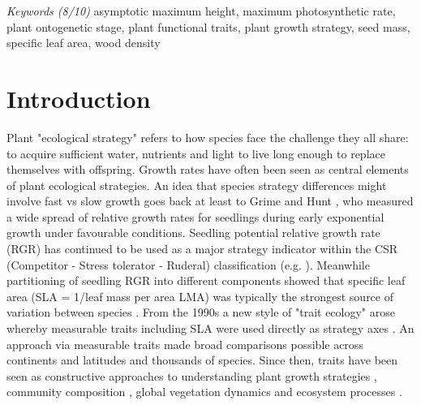\documentclass[a4paper]{article}\usepackage[]{graphicx}\usepackage[]{color}
\begin{document}
\textit{Keywords (8/10)} asymptotic maximum height, maximum photosynthetic rate, plant ontogenetic stage, plant functional traits, plant growth strategy, seed mass, specific leaf area, wood density 


\clearpage

\section*{Introduction}\label{introduction}
Plant "ecological strategy" refers to how species face the challenge they all share: to acquire sufficient water, nutrients and light to live long enough to replace themselves with offspring. Growth rates have often been seen as central elements of plant ecological strategies. An idea that species strategy differences might involve fast vs slow growth goes back at least to Grime and Hunt \citeyearpar{Grime:1975gr}, who measured a wide spread of relative growth rates for seedlings during early exponential growth under favourable conditions. Seedling potential relative growth rate (RGR) has continued to be used as a major strategy indicator within the CSR (Competitor - Stress tolerator - Ruderal) classification (e.g. \citealt{grime1979plant, Grime:1997wm}). Meanwhile partitioning of seedling RGR into different components showed that specific leaf area (SLA = 1/leaf mass per area LMA) was typically the strongest source of variation between species \citep{Poorter:1989tx}. From the 1990s a new style of "trait ecology" arose whereby measurable traits including SLA were used directly as strategy axes \citep{Westoby:2002ft}. An approach via measurable traits made broad comparisons possible across continents and latitudes and thousands of species. Since then, traits have been seen as constructive approaches to understanding plant growth strategies \citep{Grime:1977kc,Chapin:1980gz}, community composition \citep{Lavorel:2002ff,Shipley:2006ie}, global vegetation dynamics \citep{Scheiter:2013ed} and ecosystem processes \citep{Lavorel:2002ff}.
\end{document}
